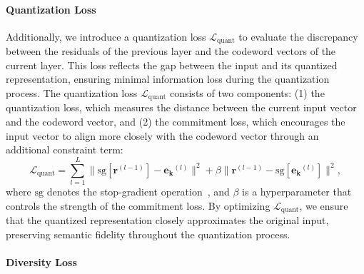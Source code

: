 \paragraph{Quantization Loss}

Additionally, we introduce a quantization loss $\mathcal{L}_{\text{quant}}$ to evaluate the discrepancy between the residuals of the previous layer and the codeword vectors of the current layer. 
This loss reflects the gap between the input and its quantized representation, ensuring minimal information loss during the quantization process. 
The quantization loss $\mathcal{L}_{\text{quant}}$ consists of two components: (1) the quantization loss, which measures the distance between the current input vector and the codeword vector, and (2) the commitment loss, which encourages the input vector to align more closely with the codeword vector through an additional constraint term:
\begin{equation}\label{equ:quant-loss}
    \mathcal{L}_{\text{quant}} = \sum_{l=1}^{L} \| \text{sg}[\mathbf{r}^{(l-1)}] - \mathbf{e_k}^{(l)} \|^2 + \beta \| \mathbf{r}^{(l-1)} - \text{sg}[\mathbf{e_k}^{(l)}] \|^2 ,
\end{equation}
where $\text{sg}$ denotes the stop-gradient operation~\cite{van2017neural}, and $\beta$ is a hyperparameter that controls the strength of the commitment loss. 
By optimizing $\mathcal{L}_{\text{quant}}$, we ensure that the quantized representation closely approximates the original input, preserving semantic fidelity throughout the quantization process.

\paragraph{Diversity Loss} 

